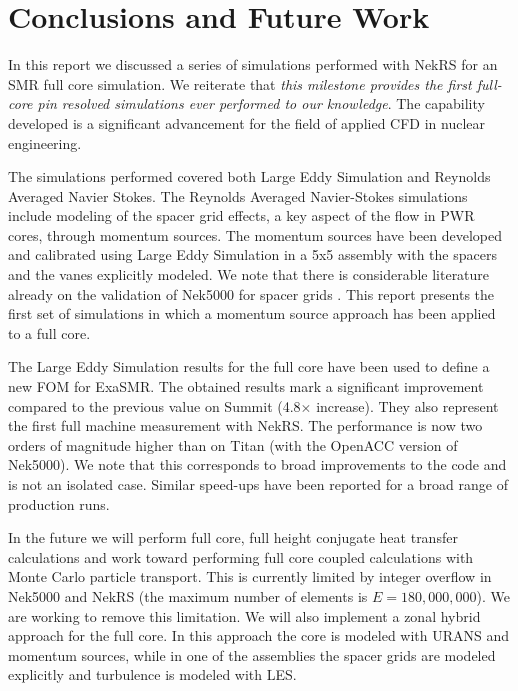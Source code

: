 \section{Conclusions and Future Work}
\label{sec:conc}

In this report we discussed a series of simulations performed with NekRS for an SMR full core simulation. We reiterate that \textit{this milestone provides the first full-core pin resolved simulations ever performed to our knowledge}. The capability developed is a significant advancement for the field of applied CFD in nuclear engineering.

The simulations performed covered both Large Eddy Simulation and Reynolds Averaged Navier Stokes. The Reynolds Averaged Navier-Stokes simulations include modeling of the spacer grid effects, a key aspect of the flow in PWR cores, through momentum sources. The momentum sources have been developed and calibrated using Large Eddy Simulation in a 5x5 assembly with the spacers and the vanes explicitly modeled. We note that there is considerable literature already on the validation of Nek5000 for spacer grids \cite{BUSCO2019144,yuan2020spectral}. This report presents the first set of simulations in which a momentum source approach has been applied to a full core.

The Large Eddy Simulation results for the full core have been used to define a new FOM for ExaSMR. The obtained results mark a significant improvement compared to the previous value on Summit (4.8$\times$ increase). They also represent the first full machine measurement with NekRS.  The performance is now two orders of magnitude higher than on Titan (with the OpenACC version of Nek5000). We note that this corresponds to broad improvements to the code and is not an isolated case. Similar speed-ups have been reported for a broad range of production runs.

In the future we will perform full core, full height conjugate heat transfer calculations and work toward performing full core coupled calculations with Monte Carlo particle transport. This is currently limited by integer overflow in Nek5000 and NekRS (the maximum number of elements is $E=180,000,000$). We are working to remove this limitation. We will also implement a zonal hybrid approach for the full core. In this approach the core is modeled with URANS and momentum sources, while in one of the assemblies the spacer grids are modeled explicitly and turbulence is modeled with LES.

